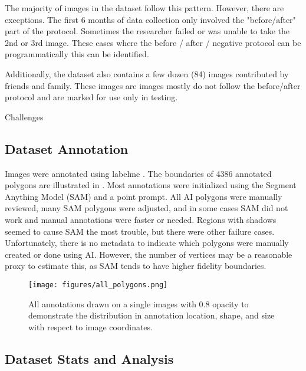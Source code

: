 \documentclass[10pt,twocolumn,letterpaper]{article}
\begin{document}
The majority of images in the dataset follow this pattern.
However, there are exceptions.
The first 6 months of data collection only involved the "before/after" part of the protocol.
Sometimes the researcher failed or was unable to take the 2nd or 3rd image.
These cases where the before / after / negative protocol can be
programmatically this can be identified.

Additionally, the dataset also contains a few dozen (84) images contributed
by friends and family. These images are images mostly do not follow the
before/after protocol and are marked for use only in testing.



Challenges

\subsection{Dataset Annotation}

Images were annotated using labelme \cite{wada_labelmeailabelme_nodate}. 
The boundaries of 4386 annotated polygons are illustrated in .
Most annotations were initialized using the Segment Anything Model (SAM)
\cite{kirillov_segment_2023} and a point prompt. 
All AI polygons were manually reviewed, many SAM polygons were adjusted, and in
some cases SAM did not work and manual annotations were faster or needed.
Regions with shadows seemed to cause SAM the most trouble, but there were other
failure cases. Unfortunately, there is no metadata to indicate which polygons
were manually created or done using AI.  However, the number of vertices may be
a reasonable proxy to estimate this, as SAM tends to have higher fidelity
boundaries. 


\begin{figure}[h]
\centering
\texttt{[image: figures/all\_polygons.png]}
\caption[]{
    All annotations drawn on a single images with 0.8 opacity to demonstrate
    the distribution in annotation location, shape, and size with respect to
    image coordinates.
}
\label{fig:AllPolygons}
\end{figure}

\subsection{Dataset Stats and Analysis}
\end{document}
